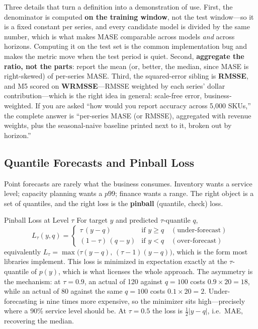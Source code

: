 Three details that turn a definition into a demonstration of use. First, the denominator is computed \textbf{on the training window}, not the test window---so it is a fixed constant per series, and every candidate model is divided by the same number, which is what makes MASE comparable across models \emph{and} across horizons. Computing it on the test set is the common implementation bug and makes the metric move when the test period is quiet. Second, \textbf{aggregate the ratio, not the parts}: report the mean (or, better, the median, since MASE is right-skewed) of per-series MASE. Third, the squared-error sibling is \textbf{RMSSE}, and M5 scored on \textbf{WRMSSE}---RMSSE weighted by each series' dollar contribution---which is the right idea in general: scale-free error, business-weighted. If you are asked ``how would you report accuracy across 5{,}000 SKUs,'' the complete answer is ``per-series MASE (or RMSSE), aggregated with revenue weights, plus the seasonal-naive baseline printed next to it, broken out by horizon.''

\subsection{Quantile Forecasts and Pinball Loss}

Point forecasts are rarely what the business consumes. Inventory wants a service level; capacity planning wants a $p99$; finance wants a range. The right object is a set of quantiles, and the right loss is the \textbf{pinball} (quantile, check) loss.

\begin{mathresult}{Pinball Loss at Level $\tau$}
For target $y$ and predicted $\tau$-quantile $q$,
\begin{equation}
L_\tau(y, q) = \begin{cases} \tau\,(y - q) & \text{if } y \ge q \quad (\text{under-forecast}) \\[2pt] (1-\tau)\,(q - y) & \text{if } y < q \quad (\text{over-forecast}) \end{cases}
\end{equation}
equivalently $L_\tau = \max\big(\tau(y-q),\,(\tau-1)(y-q)\big)$, which is the form most libraries implement. This loss is minimized in expectation exactly at the $\tau$-quantile of $p(y)$, which is what licenses the whole approach. The asymmetry is the mechanism: at $\tau = 0.9$, an actual of 120 against $q = 100$ costs $0.9 \times 20 = 18$, while an actual of 80 against the same $q=100$ costs $0.1 \times 20 = 2$. Under-forecasting is nine times more expensive, so the minimizer sits high---precisely where a 90\% service level should be. At $\tau = 0.5$ the loss is $\tfrac12|y-q|$, i.e.\ MAE, recovering the median.
\end{mathresult}

